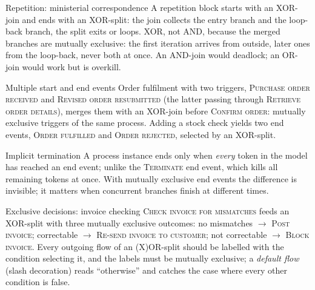 \begin{examplebox}{Repetition: ministerial correspondence}
A repetition block starts with an XOR-join and ends with an XOR-split: the join collects the entry branch and the loop-back branch, the split exits or loops. XOR, not AND, because the merged branches are mutually exclusive: the first iteration arrives from outside, later ones from the loop-back, never both at once. An AND-join would deadlock; an OR-join would work but is overkill.
\end{examplebox}

\begin{examplebox}{Multiple start and end events}
Order fulfilment with two triggers, \textsc{Purchase order received} and \textsc{Revised order resubmitted} (the latter passing through \textsc{Retrieve order details}), merges them with an XOR-join before \textsc{Confirm order}: mutually exclusive triggers of the same process. Adding a stock check yields two end events, \textsc{Order fulfilled} and \textsc{Order rejected}, selected by an XOR-split.
\end{examplebox}

\begin{notebox}{Implicit termination}
A process instance ends only when \emph{every} token in the model has reached an end event; unlike the \textsc{Terminate} end event, which kills all remaining tokens at once. With mutually exclusive end events the difference is invisible; it matters when concurrent branches finish at different times.
\end{notebox}

\begin{examplebox}{Exclusive decisions: invoice checking}
\textsc{Check invoice for mismatches} feeds an XOR-split with three mutually exclusive outcomes: no mismatches $\to$ \textsc{Post invoice}; correctable $\to$ \textsc{Re-send invoice to customer}; not correctable $\to$ \textsc{Block invoice}. Every outgoing flow of an (X)OR-split should be labelled with the condition selecting it, and the labels must be mutually exclusive; a \emph{default flow} (slash decoration) reads ``otherwise'' and catches the case where every other condition is false.
\end{examplebox}

